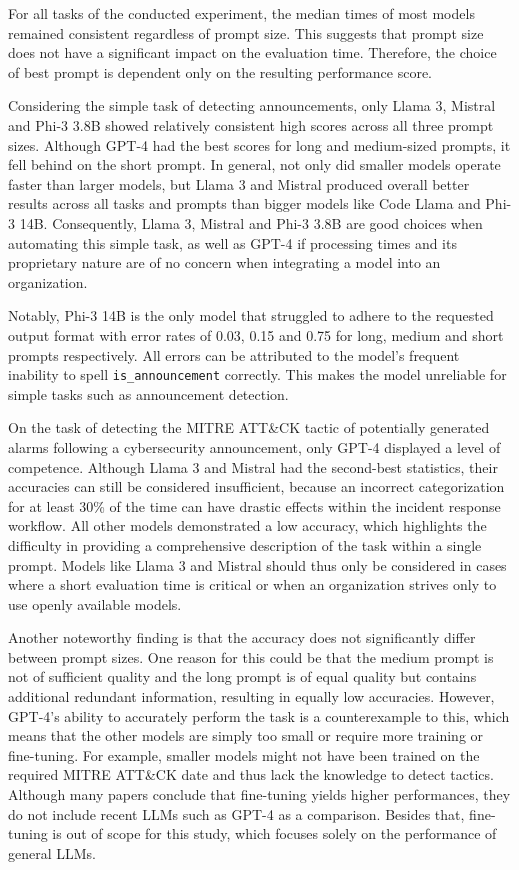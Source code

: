 For all tasks of the conducted experiment, the median times of most models remained consistent regardless of prompt
size.
This suggests that prompt size does not have a significant impact on the evaluation time.
Therefore, the choice of best prompt is dependent only on the resulting performance score.

Considering the simple task of detecting announcements, only Llama 3, Mistral and Phi-3 3.8B showed relatively
consistent high scores across all three prompt sizes.
Although GPT-4 had the best scores for long and medium-sized prompts, it fell behind on the short prompt.
In general, not only did smaller models operate faster than larger models, but Llama 3 and Mistral produced overall
better results across all tasks and prompts than bigger models like Code Llama and Phi-3 14B\@.
Consequently, Llama 3, Mistral and Phi-3 3.8B are good choices when automating this simple task, as well as GPT-4 if
processing times and its proprietary nature are of no concern when integrating a model into an organization.

Notably, Phi-3 14B is the only model that struggled to adhere to the requested output format with error rates of 0.03,
0.15 and 0.75 for long, medium and short prompts respectively.
All errors can be attributed to the model's frequent inability to spell \texttt{is\_announcement} correctly.
This makes the model unreliable for simple tasks such as announcement detection.
%

On the task of detecting the MITRE ATT\&CK tactic of potentially generated alarms following a cybersecurity
announcement, only GPT-4 displayed a level of competence.
Although Llama 3 and Mistral had the second-best statistics, their accuracies can still be considered insufficient,
because an incorrect categorization for at least 30\% of the time can have drastic effects within the incident response
workflow.
All other models demonstrated a low accuracy, which highlights the difficulty in providing a comprehensive description
of the task within a single prompt.
Models like Llama 3 and Mistral should thus only be considered in cases where a short evaluation time is critical or
when an organization strives only to use openly available models.

Another noteworthy finding is that the accuracy does not significantly differ between prompt sizes.
One reason for this could be that the medium prompt is not of sufficient quality and the long prompt is of equal quality
but contains additional redundant information, resulting in equally low accuracies.
However, GPT-4's ability to accurately perform the task is a counterexample to this, which means that the other models
are simply too small or require more training or fine-tuning.
For example, smaller models might not have been trained on the required MITRE ATT\&CK date and thus lack the knowledge
to detect tactics.
Although many papers conclude that fine-tuning yields higher performances, they do not include recent LLMs such as
GPT-4 as a comparison.
Besides that, fine-tuning is out of scope for this study, which focuses solely on the performance of general LLMs.

